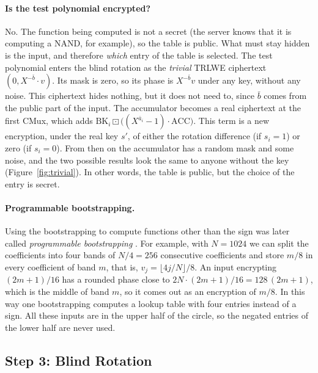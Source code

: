 \documentclass[12pt]{article}
\theoremstyle{plain}
\theoremstyle{definition}
\newcommand{\BK}{\mathrm{BK}}
\newcommand{\ext}{\boxdot}
\begin{document}
\paragraph{Is the test polynomial encrypted?}
No. The function being computed is not a secret (the server knows that it is
computing a NAND, for example), so the table is public. What must stay hidden
is the input, and therefore \emph{which} entry of the table is selected. The
test polynomial enters the blind rotation as the \emph{trivial} TRLWE
ciphertext $(0,X^{-\bar b}\cdot v)$. Its mask is zero, so its phase is
$X^{-\bar b}v$ under any key, without any noise. This ciphertext hides nothing,
but it does not need to, since $\bar b$ comes from the public part of the
input. The accumulator becomes a real ciphertext at the first CMux, which adds
$\BK_i\ext\big((X^{\bar a_i}-1)\cdot\mathrm{ACC}\big)$. This term is a new
encryption, under the real key $s'$, of either the rotation difference (if
$s_i=1$) or zero (if $s_i=0$). From then on the accumulator has a random mask and
some noise, and the two possible results look the same to anyone without the
key (Figure~\ref{fig:trivial}). In other words, the table is public, but the
choice of the entry is secret.



\paragraph{Programmable bootstrapping.}
Using the bootstrapping to compute functions other than the sign was later
called \emph{programmable bootstrapping} \cite{chillotti2021pbs}. For example,
with $N=1024$ we can split the coefficients into four bands of $N/4=256$
consecutive coefficients and store $m/8$ in every coefficient of band $m$, that
is, $v_j=\lfloor4j/N\rfloor/8$. An input encrypting $(2m+1)/16$ has a rounded
phase close to $2N\cdot(2m+1)/16=128\,(2m+1)$, which is the middle of band $m$,
so it comes out as an encryption of $m/8$. In this way one bootstrapping
computes a lookup table with four entries instead of a sign. All these inputs
are in the upper half of the circle, so the negated entries of the lower half
are never used.

\subsection{Step 3: Blind Rotation}
\label{sec:blindrot}
\end{document}
